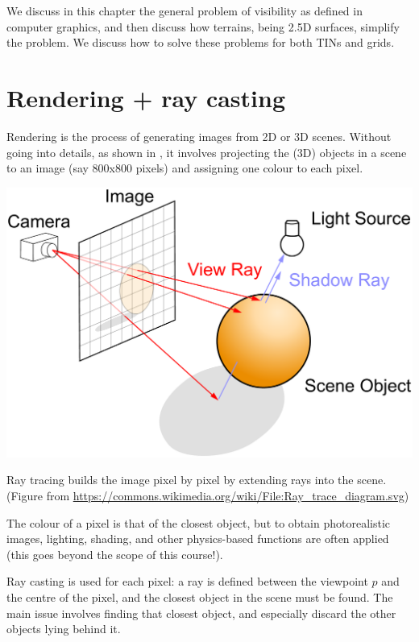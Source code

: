 %

We discuss in this chapter the general problem of visibility as defined in computer graphics, and then discuss how terrains, being 2.5D surfaces, simplify the problem.
We discuss how to solve these problems for both TINs and grids.


%
\section{Rendering + ray casting}

Rendering is the process of generating images from 2D or 3D scenes.
Without going into details, as shown in , it involves projecting the (3D) objects in a scene to an image (say 800x800 pixels) and assigning one colour to each pixel.
\begin{marginfigure}
  \centering
  \includegraphics[width=\linewidth]{figs/Ray_trace_diagram.pdf}
  \caption{Ray tracing builds the image pixel by pixel by extending rays into the scene. (Figure from \url{https://commons.wikimedia.org/wiki/File:Ray_trace_diagram.svg})}%
\end{marginfigure}
The colour of a pixel is that of the closest object, but to obtain photorealistic images, lighting, shading, and other physics-based functions are often applied (this goes beyond the scope of this course!).

Ray casting is used for each pixel: a ray is defined between the viewpoint $p$ and the centre of the pixel, and the closest object in the scene must be found.
The main issue involves finding that closest object, and especially discard the other objects lying behind it.


